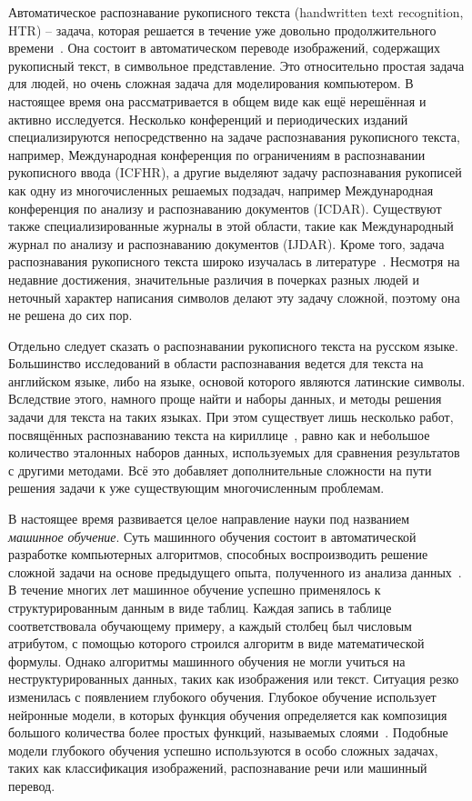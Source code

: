 Автоматическое распознавание рукописного текста (handwritten text recognition, HTR) -- задача, которая решается в течение уже довольно продолжительного времени~\cite{plamondon2000online}.
Она состоит в автоматическом переводе изображений, содержащих рукописный текст, в символьное представление.
Это относительно простая задача для людей, но очень сложная задача для моделирования компьютером.
В настоящее время она рассматривается в общем виде как ещё нерешённая и активно исследуется.
Несколько конференций и периодических изданий специализируются непосредственно на задаче распознавания рукописного текста, например,
Международная конференция по ограничениям в распознавании рукописного ввода (ICFHR),
а другие выделяют задачу распознавания рукописей как одну из многочисленных решаемых подзадач,
например Международная конференция по анализу и распознаванию документов (ICDAR).
Существуют также специализированные журналы в этой области, такие как Международный журнал по анализу и распознаванию документов (IJDAR).
Кроме того, задача распознавания рукописного текста широко изучалась в литературе~\cite{plamondon2000online,sueiras2021continuous}.
Несмотря на недавние достижения, значительные различия в почерках разных людей и неточный характер написания символов
делают эту задачу сложной, поэтому она не решена до сих пор.

Отдельно следует сказать о распознавании рукописного текста на русском языке.
Большинство исследований в области распознавания ведется для текста на английском языке, либо на языке, основой которого являются латинские символы.
Вследствие этого, намного проще найти и наборы данных, и методы решения задачи для текста на таких языках.
При этом существует лишь несколько работ, посвящённых распознаванию текста на кириллице~\cite{abdallah2020attention,shonenkov2021stackmix},
равно как и небольшое количество эталонных наборов данных, используемых для сравнения результатов с другими методами.
Всё это добавляет дополнительные сложности на пути решения задачи к уже существующим многочисленным проблемам.

В настоящее время развивается целое направление науки под названием \textit{машинное обучение}.
Суть машинного обучения состоит в автоматической разработке компьютерных алгоритмов,
способных воспроизводить решение сложной задачи на основе предыдущего опыта, полученного из анализа данных~\cite{prakash2021pattern}.
В течение многих лет машинное обучение успешно применялось к структурированным данным в виде таблиц.
Каждая запись в таблице соответствовала обучающему примеру, а каждый столбец был числовым атрибутом, с помощью которого строился алгоритм в виде математической формулы.
Однако алгоритмы машинного обучения не могли учиться на неструктурированных данных, таких как изображения или текст.
Ситуация резко изменилась с появлением глубокого обучения.
Глубокое обучение использует нейронные модели, в которых функция обучения определяется как композиция
большого количества более простых функций, называемых слоями~\cite{goodfellow2016deep}.
Подобные модели глубокого обучения успешно используются в особо сложных задачах, таких как классификация изображений, распознавание речи или машинный перевод.

